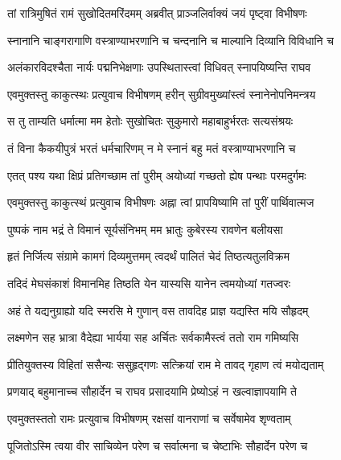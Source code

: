 
\twolineshloka
{तां रात्रिमुषितं रामं सुखोदितमरिंदमम्}
{अब्रवीत् प्राञ्जलिर्वाक्यं जयं पृष्ट्वा विभीषणः} %

\twolineshloka
{स्नानानि चाङ्गरागाणि वस्त्राण्याभरणानि च}
{चन्दनानि च माल्यानि दिव्यानि विविधानि च} %

\twolineshloka
{अलंकारविदश्चैता नार्यः पद्मनिभेक्षणाः}
{उपस्थितास्त्वां विधिवत् स्नापयिष्यन्ति राघव} %

\twolineshloka
{एवमुक्तस्तु काकुत्स्थः प्रत्युवाच विभीषणम्}
{हरीन् सुग्रीवमुख्यांस्त्वं स्नानेनोपनिमन्त्रय} %

\twolineshloka
{स तु ताम्यति धर्मात्मा मम हेतोः सुखोचितः}
{सुकुमारो महाबाहुर्भरतः सत्यसंश्रयः} %

\twolineshloka
{तं विना कैकयीपुत्रं भरतं धर्मचारिणम्}
{न मे स्नानं बहु मतं वस्त्राण्याभरणानि च} %

\twolineshloka
{एतत् पश्य यथा क्षिप्रं प्रतिगच्छाम तां पुरीम्}
{अयोध्यां गच्छतो ह्येष पन्थाः परमदुर्गमः} %

\twolineshloka
{एवमुक्तस्तु काकुत्स्थं प्रत्युवाच विभीषणः}
{अह्ना त्वां प्रापयिष्यामि तां पुरीं पार्थिवात्मज} %

\twolineshloka
{पुष्पकं नाम भद्रं ते विमानं सूर्यसंनिभम्}
{मम भ्रातुः कुबेरस्य रावणेन बलीयसा} %

\twolineshloka
{हृतं निर्जित्य संग्रामे कामगं दिव्यमुत्तमम्}
{त्वदर्थं पालितं चेदं तिष्ठत्यतुलविक्रम} %

\twolineshloka
{तदिदं मेघसंकाशं विमानमिह तिष्ठति}
{येन यास्यसि यानेन त्वमयोध्यां गतज्वरः} %

\twolineshloka
{अहं ते यद्यनुग्राह्यो यदि स्मरसि मे गुणान्}
{वस तावदिह प्राज्ञ यद्यस्ति मयि सौहृदम्} %

\twolineshloka
{लक्ष्मणेन सह भ्रात्रा वैदेह्या भार्यया सह}
{अर्चितः सर्वकामैस्त्वं ततो राम गमिष्यसि} %

\twolineshloka
{प्रीतियुक्तस्य विहितां ससैन्यः ससुहृद्गणः}
{सत्क्रियां राम मे तावद् गृहाण त्वं मयोद्यताम्} %

\twolineshloka
{प्रणयाद् बहुमानाच्च सौहार्देन च राघव}
{प्रसादयामि प्रेष्योऽहं न खल्वाज्ञापयामि ते} %

\twolineshloka
{एवमुक्तस्ततो रामः प्रत्युवाच विभीषणम्}
{रक्षसां वानराणां च सर्वेषामेव शृण्वताम्} %

\twolineshloka
{पूजितोऽस्मि त्वया वीर साचिव्येन परेण च}
{सर्वात्मना च चेष्टाभिः सौहार्देन परेण च} %

